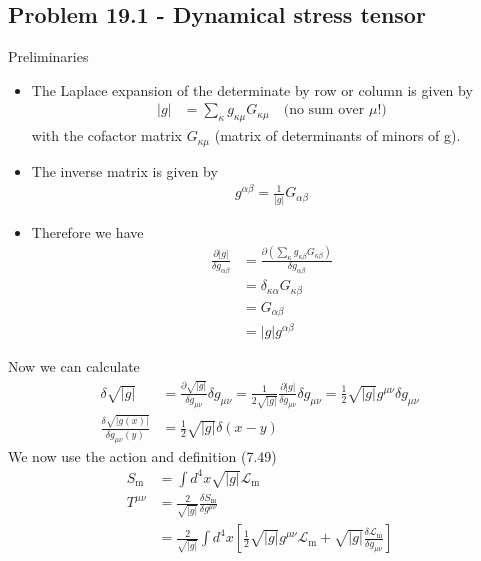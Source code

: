 \documentclass[10pt,a4paper]{book}
\theoremstyle{definition}
\begin{document}
\subsection{Problem 19.1 - Dynamical stress tensor}
Preliminaries
\begin{itemize} 
\item The Laplace expansion of the determinate by row or column is given by
\begin{align}
    |g|&=\sum_\kappa g_{\kappa\mu}G_{\kappa\mu}\quad\text{(no sum over $\mu$!)}
\end{align}
with the cofactor matrix $G_{\kappa\mu}$ (matrix of determinants of minors of g).
\item The inverse matrix is given by
\begin{align}
    g^{\alpha\beta}=\frac{1}{|g|}G_{\alpha\beta}
\end{align}
\item Therefore we have
\begin{align}
    \frac{\partial|g|}{\delta g_{\alpha\beta}}
    &=\frac{\partial\left(\sum_\kappa g_{\kappa\beta}G_{\kappa\beta}\right)}{\delta g_{\alpha\beta}}\\
    &=\delta_{\kappa\alpha}G_{\kappa\beta}\\
    &=G_{\alpha\beta}\\
    &=|g|g^{\alpha\beta}
\end{align}
\end{itemize}
Now we can calculate
\begin{align}
    \delta\sqrt{|g|}
    &=\frac{\partial\sqrt{|g|}}{\delta g_{\mu\nu}}\delta g_{\mu\nu}
    =\frac{1}{2\sqrt{|g|}}\frac{\partial|g|}{\delta g_{\mu\nu}}\delta g_{\mu\nu}
    =\frac{1}{2}\sqrt{|g|}g^{\mu\nu}\delta g_{\mu\nu}\\
    \frac{\delta\sqrt{|g(x)|}}{\delta g_{\mu\nu}(y)}
    &=\frac{1}{2}\sqrt{|g|}\delta(x-y)
\end{align}
We now use the action and definition (7.49)
\begin{align}
    S_\text{m}&=\int d^4x\sqrt{|g|}\mathscr{L}_\text{m}\\
    T^{\mu\nu}&=\frac{2}{\sqrt{|g|}}\frac{\delta S_\text{m}}{\delta g^{\mu\nu}}\\
    &=\frac{2}{\sqrt{|g|}}\int d^4x\left[\frac{1}{2}\sqrt{|g|}g^{\mu\nu}\mathscr{L}_\text{m}+\sqrt{|g|}\frac{\delta\mathscr{L}_\text{m}}{\delta g_{\mu\nu}}\right]
\end{align}
\end{document}
